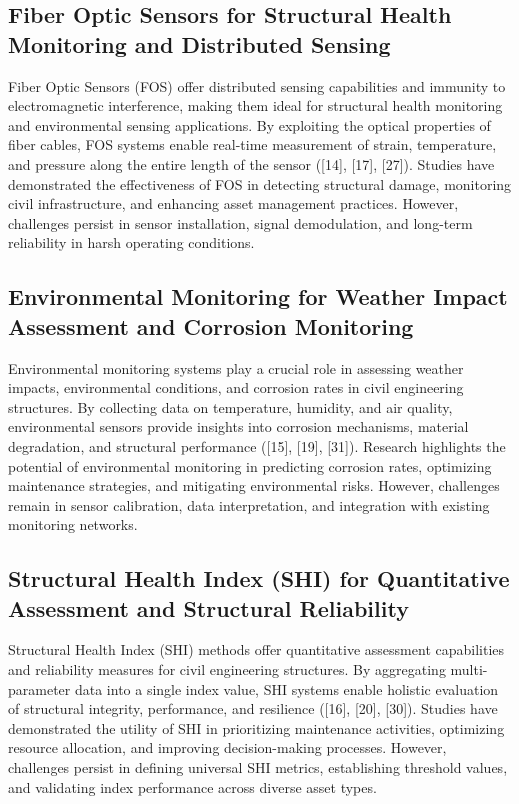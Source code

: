 \documentclass[journal, a4paper]{IEEEtran}
\begin{document}
\subsection{Fiber Optic Sensors for Structural Health Monitoring and Distributed Sensing}
Fiber Optic Sensors (FOS) offer distributed sensing capabilities and immunity to electromagnetic interference,
making them ideal for structural health monitoring and environmental sensing applications. By exploiting the
optical properties of fiber cables, FOS systems enable real-time measurement of strain, temperature, and pressure
along the entire length of the sensor ([14], [17], [27]). Studies have demonstrated the effectiveness of FOS in
detecting structural damage, monitoring civil infrastructure, and enhancing asset management practices. However,
challenges persist in sensor installation, signal demodulation, and long-term reliability in harsh operating conditions. 

\subsection{Environmental Monitoring for Weather Impact Assessment and Corrosion Monitoring}
Environmental monitoring systems play a crucial role in assessing weather impacts, environmental conditions,
and corrosion rates in civil engineering structures. By collecting data on temperature, humidity, and air quality,
environmental sensors provide insights into corrosion mechanisms, material degradation, and structural performance
([15], [19], [31]). Research highlights the potential of environmental monitoring in predicting corrosion rates,
optimizing maintenance strategies, and mitigating environmental risks. However, challenges remain in sensor calibration,
data interpretation, and integration with existing monitoring networks. 

\subsection{Structural Health Index (SHI) for Quantitative Assessment and Structural Reliability}
Structural Health Index (SHI) methods offer quantitative assessment capabilities and reliability measures for civil
engineering structures. By aggregating multi-parameter data into a single index value, SHI systems enable holistic evaluation
of structural integrity, performance, and resilience ([16], [20], [30]). Studies have demonstrated the utility of SHI
in prioritizing maintenance activities, optimizing resource allocation, and improving decision-making processes.
However, challenges persist in defining universal SHI metrics, establishing threshold values,
and validating index performance across diverse asset types. 
\end{document}
